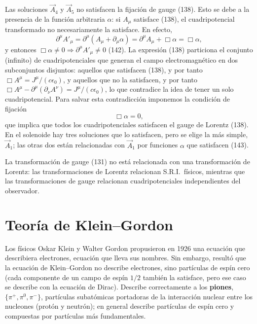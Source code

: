 Las soluciones $\vec A_4$ y $\vec A_5$ no satisfacen la fijación de gauge
(138). Esto se debe a la presencia de la función arbitraria $\alpha$:
si $A_\mu$ satisface (138), el cuadripotencial transformado no
necesariamente la satisface. En efecto,
\[
\partial^\mu A'_\mu=\partial^\mu(A_\mu+\partial_\mu\alpha)=\partial^\mu
A_\mu+\Box\alpha=\Box\alpha, \tag{141}
\]
y entonces $\Box\alpha\neq0\Rightarrow\partial^\mu A'_\mu\neq0$ (142).
La expresión (138) particiona el conjunto (infinito) de cuadripotenciales
que generan el campo electromagnético en dos subconjuntos disjuntos:
aquellos que satisfacen (138), y por tanto $\Box A^\mu=J^\mu/(c\epsilon_0)$,
y aquellos que no la satisfacen, y por tanto $\Box A^\mu-\partial^\mu
(\partial_\nu A^\nu)=J^\mu/(c\epsilon_0)$, lo que contradice la idea de
tener un solo cuadripotencial. Para salvar esta contradicción imponemos
la condición de fijación
\[
\Box\alpha=0, \tag{143}
\]
que implica que todos los cuadripotenciales satisfacen el gauge de
Lorentz (138). En el solenoide hay tres soluciones que lo satisfacen,
pero se elige la más simple, $\vec A_1$; las otras dos están relacionadas
con $\vec A_1$ por funciones $\alpha$ que satisfacen (143).

\begin{observacion}
La transformación de gauge (131) no está relacionada con una
transformación de Lorentz: las transformaciones de Lorentz relacionan
S.R.I.\ físicos, mientras que las transformaciones de gauge relacionan
cuadripotenciales independientes del observador.
\end{observacion}

\section{Teoría de Klein--Gordon}

Los físicos Oskar Klein y Walter Gordon propusieron en 1926 una ecuación
que describiera electrones, ecuación que lleva sus nombres. Sin embargo,
resultó que la ecuación de Klein--Gordon no describe electrones, sino
partículas de espín cero (cada componente de un campo de espín $1/2$
también la satisface, pero ese caso se describe con la ecuación de
Dirac). Describe correctamente a los \textbf{piones}, $\{\pi^+,\pi^0,
\pi^-\}$, partículas subatómicas portadoras de la interacción nuclear
entre los nucleones (protón y neutrón); en general describe partículas de
espín cero y compuestas por partículas más fundamentales.

